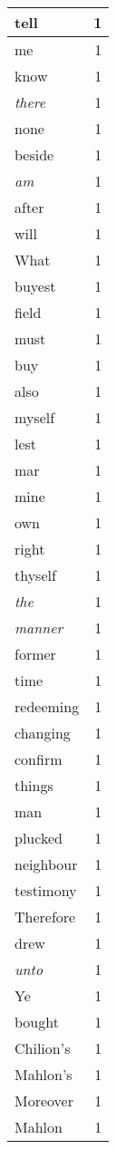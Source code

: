 \begin{center}
\begin{longtable}{l|r}
tell & 1 \\ \hline
me & 1 \\ \hline
know & 1 \\ \hline
\emph{there} & 1 \\ \hline
none & 1 \\ \hline
beside & 1 \\ \hline
\emph{am} & 1 \\ \hline
after & 1 \\ \hline
will & 1 \\ \hline
What & 1 \\ \hline
buyest & 1 \\ \hline
field & 1 \\ \hline
must & 1 \\ \hline
buy & 1 \\ \hline
also & 1 \\ \hline
myself & 1 \\ \hline
lest & 1 \\ \hline
mar & 1 \\ \hline
mine & 1 \\ \hline
own & 1 \\ \hline
right & 1 \\ \hline
thyself & 1 \\ \hline
\emph{the} & 1 \\ \hline
\emph{manner} & 1 \\ \hline
former & 1 \\ \hline
time & 1 \\ \hline
redeeming & 1 \\ \hline
changing & 1 \\ \hline
confirm & 1 \\ \hline
things & 1 \\ \hline
man & 1 \\ \hline
plucked & 1 \\ \hline
neighbour & 1 \\ \hline
testimony & 1 \\ \hline
Therefore & 1 \\ \hline
drew & 1 \\ \hline
\emph{unto} & 1 \\ \hline
Ye & 1 \\ \hline
bought & 1 \\ \hline
Chilion's & 1 \\ \hline
Mahlon's & 1 \\ \hline
Moreover & 1 \\ \hline
Mahlon & 1 \\ \hline

\end{longtable}
\end{center}
